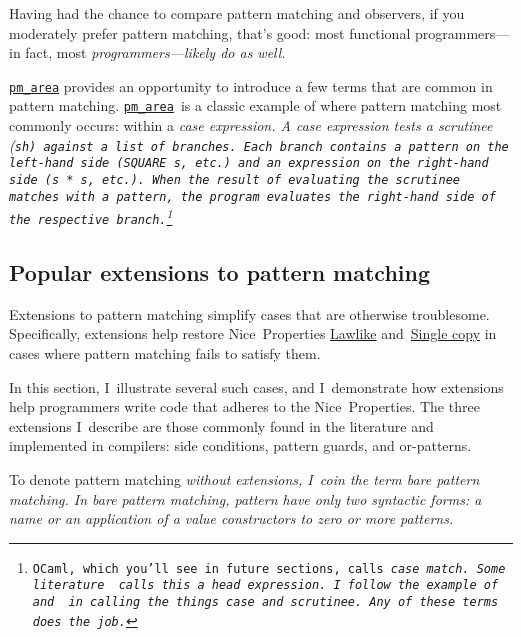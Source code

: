 \documentclass[manuscript,screen,review, 12pt, nonacm]{acmart}
\begin{document}
    Having had the chance to compare pattern matching and observers, if you
    moderately prefer pattern matching, that's good: most functional
    programmers---in fact, most \it{programmers}---likely do as well. 

    \hyperref[fig:pmarea]{\tt{pm\_area}} provides an opportunity to introduce a
    few terms that are common in pattern matching.
    \hyperref[fig:pmarea]{\tt{pm\_area}}~is a classic example of where pattern
    matching most commonly occurs: within a \it{case} expression. A \it{case}
    expression tests a \it{scrutinee} (\tt{sh}) against a list of \it{branches}.
    Each branch contains a pattern on the left-hand side (\tt{SQUARE s}, etc.)
    and an expression on the right-hand side (\tt{s * s}, etc.). When the result
    of evaluating the scrutinee matches with a pattern, the program evaluates
    the right-hand side of the respective branch.\footnote{OCaml, which you'll
    see in future sections, calls \it{case} \tt{match}. Some
    literature~\citep{guardproposal} calls this a \it{head expression}. I~follow
    the example of~\citet{bpc} and \citet{maranget} in calling the things
    \it{case} and \it{scrutinee}. Any of these terms does the job.} 

\subsection{Popular extensions to pattern matching}
\label{extensions}

    Extensions to pattern matching simplify cases that are otherwise
    troublesome. Specifically, extensions help restore Nice~Properties
    \hyperref[p1]{Lawlike} and~\hyperref[p2]{Single copy} in cases where pattern
    matching fails to satisfy them. 
    
    In this section, I~illustrate several such cases, and I~demonstrate how
    extensions help programmers write code that adheres to the Nice~Properties.
    The three extensions I~describe are those commonly found in the literature
    and implemented in compilers: side conditions, pattern guards, and
    or-patterns. 
    
    To denote pattern matching \it{without} extensions, I~coin the term \it{bare
    pattern matching}. In bare pattern matching, pattern have only two syntactic
    forms: a name or an application of a value constructors to zero or more
    patterns. 


\end{document}
